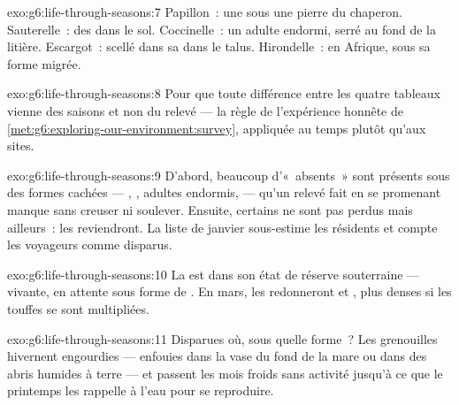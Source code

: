 \begin{solution}{exo:g6:life-through-seasons:7}
Papillon~: une  sous une pierre du chaperon. Sauterelle~:
des  dans le sol. Coccinelle~: un adulte endormi, serré au fond
de la litière. Escargot~: scellé dans sa  dans le talus.
Hirondelle~: en Afrique, sous sa forme migrée.
\end{solution}

\begin{solution}{exo:g6:life-through-seasons:8}
Pour que toute différence entre les quatre tableaux vienne des
saisons et non du relevé --- la règle de l'expérience honnête de
\cref{met:g6:exploring-our-environment:survey}, appliquée au temps
plutôt qu'aux sites.
\end{solution}

\begin{solution}{exo:g6:life-through-seasons:9}
D'abord, beaucoup d'«~absents~» sont présents sous des formes
cachées --- , , adultes endormis,  --- qu'un
relevé fait en se promenant manque sans creuser ni soulever.
Ensuite, certains ne sont pas perdus mais ailleurs~: les 
reviendront. La liste de janvier sous-estime les résidents et compte
les voyageurs comme disparus.
\end{solution}

\begin{solution}{exo:g6:life-through-seasons:10}
La  est dans son état de réserve souterraine --- vivante, en
attente sous forme de . En mars, les  redonneront
 et , plus denses si les touffes se sont multipliées.
\end{solution}

\begin{solution}{exo:g6:life-through-seasons:11}
Disparues où, sous quelle forme~? Les grenouilles hivernent
engourdies --- enfouies dans la vase du fond de la mare ou dans des
abris humides à terre --- et passent les mois froids sans activité
jusqu'à ce que le printemps les rappelle à l'eau pour se reproduire.
\end{solution}

